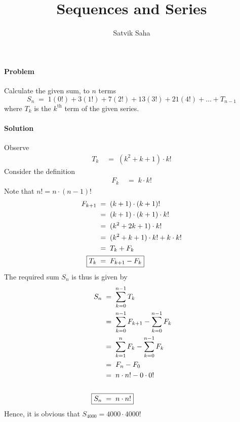 \documentclass[a4paper, 11pt, reqno]{article}
\title{Sequences and Series}
\author{Satvik Saha}
\date{}
\begin{document}
	\maketitle
	\paragraph{Problem}
	Calculate the given sum, to $n$ terms
	\begin{equation*}
		S_n  \;=\;  1(0!) + 3(1!) + 7(2!) + 13(3!) + 21(4!) + \dots + T_{n-1}
	\end{equation*}
	where $T_{k}$ is the $k^{\text{th}}$ term of the given series.
	\paragraph{Solution}
	Observe
	\begin{align*}
		T_k  \; &= \;  (k^2 + k + 1)\cdot k!
	\end{align*}
	Consider the definition
	\begin{align*}
		F_{k}  \; &= \;  k\cdot k!
	\end{align*}
	Note that $n! = n\cdot (n-1)!$
	\begin{align*}
		F_{k+1}  \; &= \; (k + 1)\cdot (k + 1)! \\
			 \; &= \; (k + 1)\cdot (k + 1)\cdot k! \\
			 \; &= \; (k^2 + 2k + 1)\cdot k! \\
			 \; &= \; (k^2 + k + 1)\cdot k! + k\cdot k! \\
			 \; &= \; T_k + F_k \\
		\Aboxed{T_k \; &= \;  F_{k+1} - F_{k}}
	\end{align*}
	The required sum $S_n$ is thus is given by
	\begin{align*}
		S_n  	\; &= \; \sum_{k=0}^{n-1} T_k \\
		 	\; &= \; \sum_{k=0}^{n-1} F_{k+1} - \sum_{k=0}^{n-1} F_{k} \\
			\; &= \; \sum_{k=1}^{n} F_k - \sum_{k=0}^{n-1} F_k \\
			\; &= \; F_n - F_0 \\
			\; &= \; n\cdot n! - 0\cdot 0! \\\\
		\Aboxed{S_n	\; &= \;  n\cdot n!}
	\end{align*}
	Hence, it is obvious that $S_{4000} = 4000\cdot 4000!$
\end{document}
